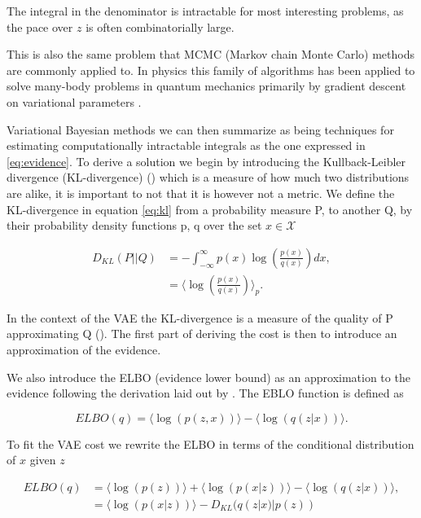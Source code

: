 \noindent The integral in the denominator is intractable for most interesting problems, as the pace over $z$ is often combinatorially large. 

This is also the same problem that MCMC (Markov chain Monte Carlo) methods are commonly applied to. In physics this family of algorithms has been applied to solve many-body problems in quantum mechanics primarily by gradient descent on variational parameters .

Variational Bayesian methods we can then summarize as being techniques for estimating computationally intractable integrals as the one expressed in \ref{eq:evidence}. To derive a solution we begin by introducing the Kullback-Leibler divergence (KL-divergence) (\cite{Kullback1951}) which is a measure of how much two distributions are alike, it is important to not that it is however not a metric. We define the KL-divergence in equation \ref{eq:kl} from a probability measure P, to another Q, by their probability density functions p, q over the set $x \in \mathcal{X}$

\begin{align}\label{eq:kl}
D_{KL} (P || Q) &= - \int^{\infty}_{-\infty} p(x) \log \left(\frac{p(x)}{q(x)}\right) dx, \\
&= \langle \log \left(\frac{p(x)}{q(x)} \right)\rangle_{p}.
\end{align}

\noindent In the context of the VAE the KL-divergence is a measure of the quality of P approximating Q (\cite{Burnham2002}). The first part of deriving the cost is then to introduce an approximation of the evidence. 

We also introduce the ELBO (evidence lower bound) as an approximation to the evidence following the derivation laid out by \cite{Kingma2013}. The EBLO function is defined as 

\begin{equation}\label{eq:elbo}
ELBO(q) = \langle \log(p(z, x)) \rangle - \langle \log(q(z|x)) \rangle.
\end{equation}

\noindent To fit the VAE cost we rewrite the ELBO in terms of the conditional distribution of $x$ given $z$

\begin{align}
ELBO(q) &= \langle \log(p(z)) \rangle +  \langle \log(p(x|z)) \rangle - \langle \log(q(z|x)) \rangle, \\
&=   \langle \log(p(x|z)) \rangle - D_{KL}(q(z|x) | p(z))
\end{align}

